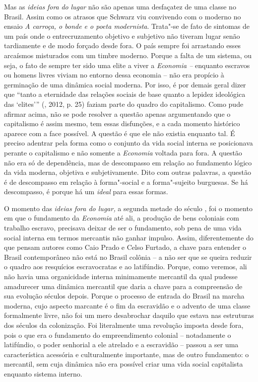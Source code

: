 {Mas as \emph{ideias} \emph{fora} \emph{do} \emph{lugar} não são apenas
uma desfaçatez de uma classe no Brasil. Assim como os atrasos que
Schwarz viu convivendo com o moderno no ensaio \emph{A carroça, o bonde
e o poeta modernista}. Trata"-se de fato de sintomas de um país onde o
entrecruzamento objetivo e subjetivo não tiveram lugar senão tardiamente
e de modo forçado desde fora. O país sempre foi arrastando esses arcaísmos
misturados com um timbre moderno. Porque a falta de um sistema, ou seja,
o fato de sempre ter sido uma elite a viver a \emph{Economia --}
enquanto escravos ou homens livres viviam no entorno dessa economia --
não era propício à germinação de uma dinâmica social moderna. Por isso,
é por demais geral dizer que ``tanto a eternidade das relações sociais
de base quanto a lepidez ideológica das `elites''' (, 2012, p.
25) faziam parte do quadro do capitalismo. Como pude afirmar acima, não se
pode resolver a questão apenas argumentando que o capitalismo é assim
mesmo, tem essas disfunções, e a cada momento histórico aparece com a
face possível. A questão é que ele não existia enquanto tal. É
preciso adentrar pela forma como o conjunto da vida social interna
se posicionava perante o capitalismo e não somente a \emph{Economia}
voltada para fora. A questão não era só de dependência, mas de
descompasso em relação ao fundamento lógico da vida moderna, objetiva e
subjetivamente. Dito com outras palavras, a questão é de descompasso em
relação à forma"-social e a forma"-sujeito burguesas. Se há descompasso, é
porque há um \emph{ideal} para essas formas.

O momento das \emph{ideias fora do lugar,} a segunda metade do século
, foi o momento em que o fundamento da \emph{Economia} até ali, a
produção de bens coloniais com trabalho escravo, precisava deixar de ser
o fundamento, sob pena de uma vida social interna em termos mercantis
não ganhar impulso. Assim, diferentemente do que pensam autores como
Caio Prado e Celso Furtado, a chave para entender o Brasil contemporâneo
não está no Brasil colônia -- a não ser que se queira reduzir o quadro
aos resquícios escravocratas e ao latifúndio. Porque, como veremos, ali
não havia uma organicidade interna minimamente mercantil da qual pudesse
amadurecer uma dinâmica mercantil que daria a chave para a compreensão
de sua evolução séculos depois. Porque o processo de entrada do Brasil
na marcha moderna, cujo aspecto marcante é o fim da escravidão e o
advento de uma classe formalmente livre, não foi um mero desabrochar
daquilo que estava nas estruturas dos séculos da colonização. Foi
literalmente uma revolução imposta desde fora, pois o que era o fundamento do
empreendimento colonial -- notadamente o latifúndio, o poder senhorial a
ele atrelado e a escravidão -- passou a ser uma característica acessória
e culturalmente importante, mas de outro fundamento: o mercantil, sem
cuja dinâmica não era possível criar uma vida social capitalista
enquanto sistema interno.

}
